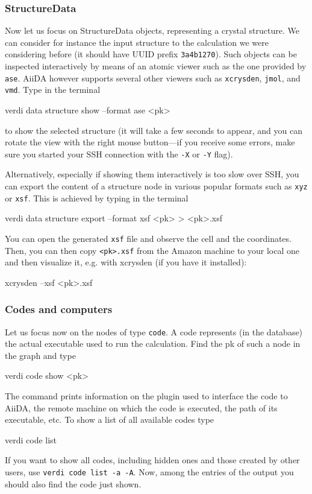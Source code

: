 \subsubsection*{StructureData}
Now let us focus on StructureData objects, representing a crystal structure.
We can consider for instance the input structure to the calculation we were 
considering before (it should have UUID prefix \texttt{3a4b1270}).
Such objects can be inspected interactively by means of an atomic viewer such as the one provided by \texttt{ase}. AiiDA however supports several other viewers such as \texttt{xcrysden}, \texttt{jmol}, and \texttt{vmd}. Type in the terminal 
\begin{bashcommand}
verdi data structure show --format ase <pk>
\end{bashcommand}
to show the selected structure (it will take a few seconds to appear, and you can rotate the view with the right mouse button---if
you receive some errors, make sure you started your SSH connection with the 
\texttt{-X} or \texttt{-Y} flag).

Alternatively, especially if showing them interactively is too slow over SSH, you can export the content of a structure node in various popular formats such as \texttt{xyz} or \texttt{xsf}. This is achieved by typing in the terminal
\begin{bashcommand}
verdi data structure export --format xsf <pk>  >  <pk>.xsf
\end{bashcommand}
You can open the generated \texttt{xsf} file and observe the cell and the coordinates. Then, you can then copy \texttt{<pk>.xsf} from the Amazon machine to your local one and then visualize it, e.g. with xcrysden (if you have it installed):
\begin{bashcommand}
xcrysden --xsf <pk>.xsf
\end{bashcommand}

\subsubsection*{Codes and computers}
Let us focus now on the nodes of type \texttt{code}. A code represents (in the database) the actual executable used to run the calculation. Find the pk of such a node in the graph and type
\begin{bashcommand}
verdi code show <pk>
\end{bashcommand}

The command prints information on the plugin used to interface the code to AiiDA, the remote machine on which the code is executed, the path of its executable, etc. To show a list of all available codes type
\begin{bashcommand}
verdi code list
\end{bashcommand}
If you want to show all codes, including hidden ones and those created by other users, use \texttt{verdi code list -a -A}. Now, among the entries of the output you should also find the code just shown.

